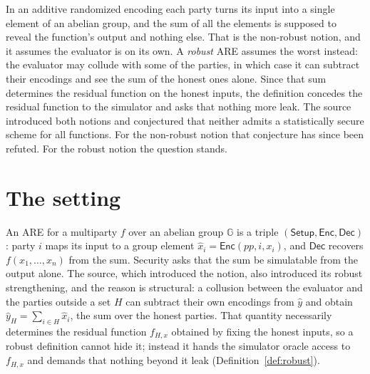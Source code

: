 \documentclass{aicr-conjecture}
\newcommand{\Gr}{\mathbb{G}}
\newcommand{\Enc}{\mathsf{Enc}}
\newcommand{\Dec}{\mathsf{Dec}}
\newcommand{\Setup}{\mathsf{Setup}}
\begin{document}

\vspace{0.4em}

\begin{informalconjecture}
In an additive randomized encoding each party turns its input into a
single element of an abelian group, and the sum of all the elements is
supposed to reveal the function's output and nothing else. That is the
non-robust notion, and it assumes the evaluator is on its own. A
\emph{robust} ARE assumes the worst instead: the evaluator may collude
with some of the parties, in which case it can subtract their encodings
and see the sum of the honest ones alone. Since that sum determines the
residual function on the honest inputs, the definition concedes the
residual function to the simulator and asks that nothing more leak. The
source introduced both notions and conjectured that neither admits a
statistically secure scheme for all functions. For the non-robust notion
that conjecture has since been refuted. For the robust notion the
question stands.
\end{informalconjecture}

\section{The setting}\label{sec:setting}

An ARE for a multiparty $f$ over an abelian group $\Gr$ is a triple
$(\Setup, \Enc, \Dec)$: party $i$ maps its input to a group element
$\widehat{x}_{i} = \Enc(pp, i, x_{i})$, and $\Dec$ recovers
$f(x_{1},\dots,x_{n})$ from the sum. Security asks that the sum be
simulatable from the output alone. The source, which introduced the
notion, also introduced its robust strengthening, and the reason is
structural: a collusion between the evaluator and the parties outside a
set $H$ can subtract their own encodings from $\widehat{y}$ and obtain
$\widehat{y}_{H} = \sum_{i \in H}\widehat{x}_{i}$, the sum over the
honest parties. That quantity necessarily determines the residual
function $f_{H,x}$ obtained by fixing the honest inputs, so a robust
definition cannot hide it; instead it hands the simulator oracle access
to $f_{H,x}$ and demands that nothing beyond it leak
(Definition~\ref{def:robust}).
\end{document}
